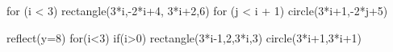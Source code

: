 \documentclass{article}
\theoremstyle{definition}
\begin{document}
\begin{myverbbox}[\small]{\firstFirstPageCode}
for (i < 3)
 rectangle(3*i,-2*i+4,
           3*i+2,6)
 for (j < i + 1)
  circle(3*i+1,-2*j+5)
\end{myverbbox}
\begin{myverbbox}[\small]{\secondFirstPageCode}
reflect(y=8)
 for(i<3)
  if(i>0)
   rectangle(3*i-1,2,3*i,3)
  circle(3*i+1,3*i+1)
\end{myverbbox}
\end{document}
